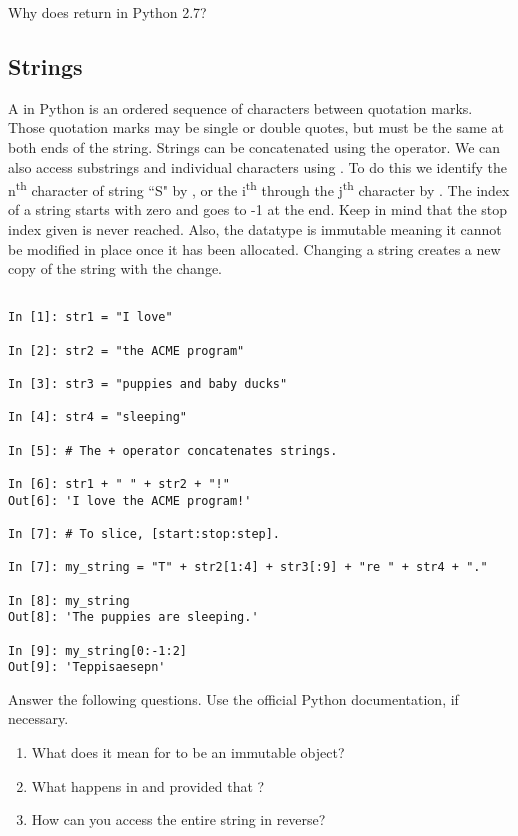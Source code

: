 \begin{problem}
Why does  return  in Python 2.7? 
\end{problem}

\subsection*{Strings}
\begin{example}

A  in Python is an ordered sequence of characters 
between quotation marks. Those quotation marks may be single or double quotes, but must be the same at both ends of the string.
Strings can be concatenated using the \li{+} operator. We can also access substrings and individual characters using \li{[ ]}. To do this we identify the n\textsuperscript{th} character of string ``S" by , or the i\textsuperscript{th} through the j\textsuperscript{th} character by .
The index of a string starts with zero and goes to -1 at the end. Keep in mind 
that the stop index given is never reached. Also, the  datatype is immutable meaning it cannot be modified in place once 
it has been allocated. Changing a string creates a new copy of the string with the change.

\begin{lstlisting}

In [1]: str1 = "I love"

In [2]: str2 = "the ACME program"

In [3]: str3 = "puppies and baby ducks"

In [4]: str4 = "sleeping"

In [5]: # The + operator concatenates strings.

In [6]: str1 + " " + str2 + "!"
Out[6]: 'I love the ACME program!'

In [7]: # To slice, [start:stop:step].

In [7]: my_string = "T" + str2[1:4] + str3[:9] + "re " + str4 + "."

In [8]: my_string
Out[8]: 'The puppies are sleeping.'

In [9]: my_string[0:-1:2]
Out[9]: 'Teppisaesepn'

\end{lstlisting}
\end{example}

\begin{problem}
Answer the following questions. Use the official Python documentation, if necessary.

\begin{enumerate}

\item What does it mean for  to be an immutable object? 
\item What happens in  and  provided 
that ? 
\item How can you access the entire string in reverse?

\end{enumerate}
\end{problem}


